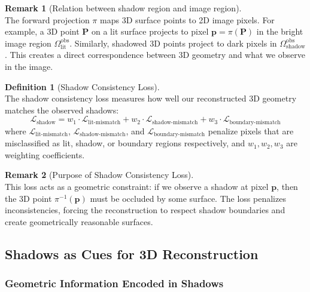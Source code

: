 \documentclass[12pt]{article}
\newcommand{\vect}[1]{\bm{#1}}
\theoremstyle{definition}
\newtheorem{definition}{Definition}[subsection]
\newtheorem{remark}{Remark}[subsection]
\begin{document}
\begin{remark}[Relation between shadow region and image region] \label{rmk:shadow_projection} ~\\
The forward projection $\pi$ maps 3D surface points to 2D image pixels. For example, a 3D point $\vect{P}$ on a lit surface projects to pixel $\vect{p} = \pi(\vect{P})$ in the bright image region $\Omega_{\text{lit}}^{\text{obs}}$. Similarly, shadowed 3D points project to dark pixels in $\Omega_{\text{shadow}}^{\text{obs}}$. This creates a direct correspondence between 3D geometry and what we observe in the image.
\end{remark}

\begin{definition}[Shadow Consistency Loss] \label{def:shadow_loss} ~\\
The shadow consistency loss measures how well our reconstructed 3D geometry matches the observed shadows:
\begin{equation}
\mathcal{L}_{\text{shadow}} = w_1 \cdot \mathcal{L}_{\text{lit-mismatch}} + w_2 \cdot \mathcal{L}_{\text{shadow-mismatch}} + w_3 \cdot \mathcal{L}_{\text{boundary-mismatch}}
\end{equation}
where $\mathcal{L}_{\text{lit-mismatch}}$, $\mathcal{L}_{\text{shadow-mismatch}}$, and $\mathcal{L}_{\text{boundary-mismatch}}$ penalize pixels that are misclassified as lit, shadow, or boundary regions respectively, and $w_1, w_2, w_3$ are weighting coefficients.
\end{definition}

\begin{remark}[Purpose of Shadow Consistency Loss] \label{rmk:shadow_loss_purpose} ~\\
This loss acts as a geometric constraint: if we observe a shadow at pixel $\vect{p}$, then the 3D point $\pi^{-1}(\vect{p})$ must be occluded by some surface. The loss penalizes inconsistencies, forcing the reconstruction to respect shadow boundaries and create geometrically reasonable surfaces.
\end{remark}

\subsection{Shadows as Cues for 3D Reconstruction} \label{sec:shadow_cues}

\subsubsection*{Geometric Information Encoded in Shadows} \label{sec:shadow_geom_info}
\end{document}
